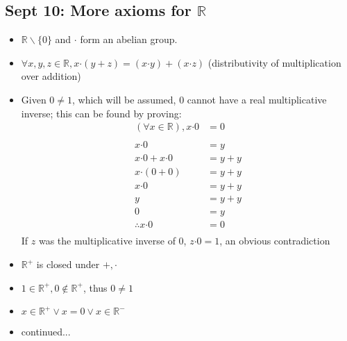 \documentclass[10pt, oneside]{article}
\newcommand{\R}{\mathbb{R}}
\newcommand{\Cdot}{\boldsymbol{\cdot}}
\begin{document}
\subsection{Sept 10: More axioms for $\R$}
\begin{itemize}
    \item $\R \backslash \{0\}$ and $\Cdot$ form an abelian group.
    \item $\forall x,y,z \in \R, x \Cdot (y+z)=(x \Cdot y)+(x \Cdot z)$ (distributivity of multiplication over addition)
    \item Given $0\neq1$, which will be assumed, $0$ cannot have a real multiplicative inverse; this can be found by proving:\\
    \begin{align*}
        (\forall x \in \R), x \Cdot 0&=0\\
        \\
        x \Cdot 0&=y\\
        x \Cdot 0+x \Cdot 0&=y+y\\
        x \Cdot (0+0)&=y+y\\
        x \Cdot 0&=y+y\\
        y&=y+y\\
        0&=y\\
        \therefore x \Cdot 0&=0 \\
    \end{align*}
    If $z$ was the multiplicative inverse of $0$, $z \Cdot 0=1$, an obvious contradiction
    \item $\R^+$ is closed under $+, \Cdot $
    \item $1\in\R^+, 0\notin\R^+$, thus $0\neq1$
    \item $x \in \R^+ \lor x=0 \lor x\in\R^-$
    \item continued...
\end{itemize}
\end{document}
